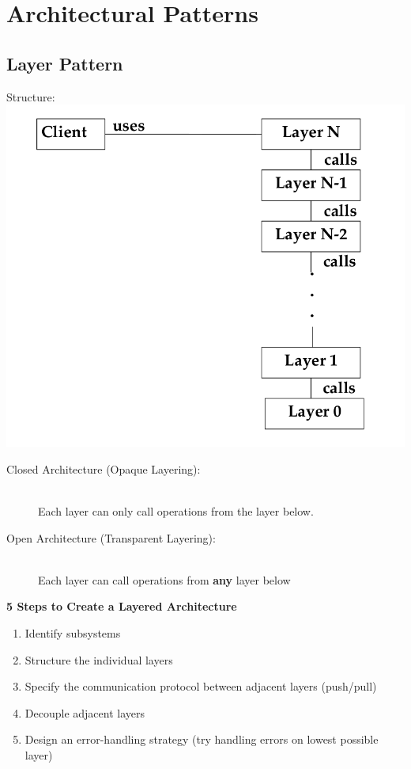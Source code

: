 
\section{Architectural Patterns}

\subsection{Layer Pattern}
Structure:\\
\includegraphics[width=.75\linewidth]{images/pattern_layer.png}
\begin{description}
  \item[Closed Architecture (Opaque Layering):]\hfill \\
    Each layer can only call operations from the layer below.\\
  \item[Open Architecture (Transparent Layering):]\hfill \\
    Each layer can call operations from \textbf{any} layer below
\end{description}

\textbf{5 Steps to Create a Layered Architecture}
\begin{enumerate}
  \item Identify subsystems
  \item Structure the individual layers
  \item Specify the communication protocol between adjacent layers (push/pull)
  \item Decouple adjacent layers
  \item Design an error-handling strategy (try handling errors on lowest possible layer)
\end{enumerate}
\newpage

